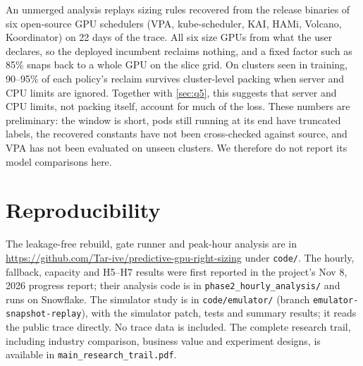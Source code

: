 \documentclass[10pt]{article}
\begin{document}
An unmerged analysis replays sizing rules recovered from the release binaries of six open-source GPU schedulers (VPA, kube-scheduler, KAI, HAMi, Volcano, Koordinator) on 22 days of the trace. All six size GPUs from what the user declares, so the deployed incumbent reclaims nothing, and a fixed factor such as 85\% snaps back to a whole GPU on the slice grid. On clusters seen in training, 90--95\% of each policy's reclaim survives cluster-level packing when server and CPU limits are ignored. Together with \cref{sec:q5}, this suggests that server and CPU limits, not packing itself, account for much of the loss. These numbers are preliminary: the window is short, pods still running at its end have truncated labels, the recovered constants have not been cross-checked against source, and VPA has not been evaluated on unseen clusters. We therefore do not report its model comparisons here.

\section{Reproducibility}
\label{app:repro}

The leakage-free rebuild, gate runner and peak-hour analysis are in \url{https://github.com/Tar-ive/predictive-gpu-right-sizing} under \texttt{code/}. The hourly, fallback, capacity and H5--H7 results were first reported in the project's Nov 8, 2026 progress report; their analysis code is in \texttt{phase2\_hourly\_analysis/} and runs on Snowflake. The simulator study is in \texttt{code/emulator/} (branch \texttt{emulator-snapshot-replay}), with the simulator patch, tests and summary results; it reads the public trace directly. No trace data is included. The complete research trail, including industry comparison, business value and experiment designs, is available in \texttt{main\_research\_trail.pdf}.
\end{document}
